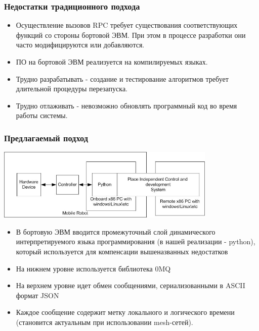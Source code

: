 \documentclass{beamer}
\begin{document}
\begin{frame}
\frametitle{Недостатки традиционного подхода}
\begin{itemize}
\item<1>Осуществление вызовов RPC требует существования соответствующих функций
со стороны бортовой ЭВМ. При этом в процессе разработки они часто модифицируются
или добавляются.
\item<1>ПО на бортовой ЭВМ реализуется на компилируемых языках.
\end{itemize}
 
\begin{itemize}
\item<1>Трудно разрабатывать - создание и тестирование алгоритмов требует
длительной процедуры перезапуска.
\item<1>Трудно отлаживать - невозможно обновлять программный код во время работы
системы.
\end{itemize}
\end{frame}

\begin{frame}
\frametitle{Предлагаемый подход}

\includegraphics[width=10.5cm]{rpc1.jpg}
\begin{itemize}
 \item<1>В бортовую ЭВМ вводится промежуточный слой динамического
 интерпретируемого языка программирования (в нашей реализации - python), который
 используется для компенсации вышеназванных недостатков
\end{itemize}
\end{frame}

\begin{frame}
\begin{itemize}
  \item На нижнем уровне используется библиотека 0MQ 
  \item На верхнем уровне идет обмен сообщениями, сериализованными в ASCII
  формат JSON
  \item Каждое сообщение содержит метку локального и логического времени
  (становится актуальным при использовании mesh-сетей).
\end{itemize}
\end{frame}
\end{document}
